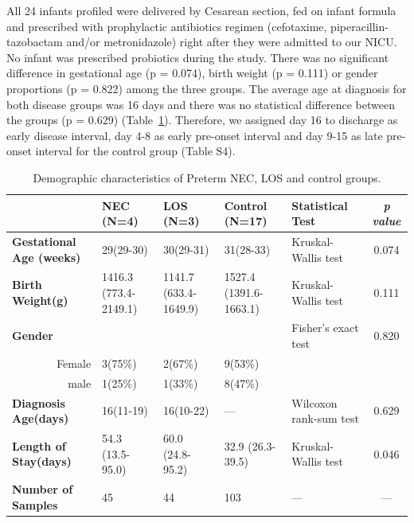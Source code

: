 \documentclass[fleqn,10pt, lineno]{wlpeerj} %
\begin{document}
   All 24 infants profiled were delivered by Cesarean section, fed on infant formula and prescribed with prophylactic antibiotics regimen (cefotaxime, piperacillin-tazobactam and/or metronidazole) right after they were admitted to our NICU. No infant was prescribed probiotics during the study. There was no significant difference in gestational age (p = 0.074), birth weight (p = 0.111) or gender proportions (p = 0.822) among the three groups. The average age at diagnosis for both disease groups was 16 days and there was no statistical difference between the groups (p = 0.629) (Table~\ref{tab:demographic}). Therefore, we assigned day 16 to discharge as early disease interval, day 4-8 as early pre-onset interval and day 9-15 as late pre-onset interval for the control group (Table S4).
    \begin{table}[!hpb]
       \centering
       \caption{\label{tab:demographic}Demographic characteristics of Preterm NEC, LOS and control groups.}
      \begin{tabular}{lp{1.8cm}p{1.8cm}p{1.8cm}p{2cm}c}
        \toprule
          & \textbf{NEC (N=4)} & \textbf{LOS (N=3)} & \textbf{Control (N=17)} & \textbf{Statistical Test} & \textit{p value} \\ \midrule
        \textbf{Gestational Age (weeks)} & 29(29-30) & 30(29-31) & 31(28-33) & Kruskal-Wallis test & 0.074 \\
        \textbf{Birth Weight(g)} & 1416.3 (773.4-2149.1) & 1141.7 (633.4-1649.9) & 1527.4 (1391.6-1663.1) & Kruskal-Wallis test & 0.111 \\
        \textbf{Gender} &  &  &  & Fisher's exact test & 0.820 \\
        \multicolumn{1}{r}{Female} & 3(75\%) & 2(67\%) & 9(53\%) &  & \\
        \multicolumn{1}{r}{male} & 1(25\%) & 1(33\%) & 8(47\%) &  & \\
        \textbf{Diagnosis Age(days)} & 16(11-19) & 16(10-22) & — & Wilcoxon rank-sum test & 0.629 \\
        \textbf{Length of Stay(days)} & 54.3 (13.5-95.0) & 60.0 (24.8-95.2) & 32.9 (26.3-39.5) & Kruskal-Wallis test & 0.046 \\
        \textbf{Number of Samples} & 45 & 44 & 103 & — & — \\ \bottomrule
      \end{tabular}
    \end{table}
\end{document}
